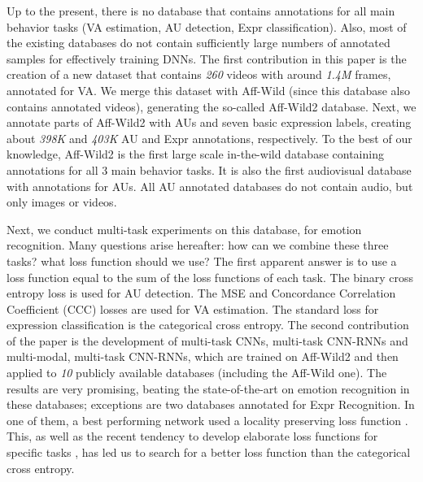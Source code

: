 \documentclass{bmvc2k}
\begin{document}
Up to the present, there is no database that contains annotations for all main behavior tasks (VA estimation, AU detection, Expr classification). Also, most of the existing databases do not contain sufficiently large numbers of annotated samples for effectively training DNNs. The first contribution in this paper is the creation of a new dataset that contains \textit{260} videos with around \textit{1.4M} frames, annotated for VA. We merge this dataset with Aff-Wild (since this database also contains annotated videos), generating the so-called Aff-Wild2 database. Next, we annotate parts of Aff-Wild2 with AUs and seven basic expression labels, creating about \textit{398K} and \textit{403K} AU and Expr annotations, respectively. To the best of our knowledge, Aff-Wild2 is the first  large scale in-the-wild database containing annotations for all 3 main behavior tasks. It is also the first audiovisual database with annotations for AUs. All AU annotated databases do not contain audio, but only images or videos. 


Next, we conduct multi-task experiments on this database, for emotion recognition. Many questions arise hereafter: how can we combine these three tasks? what loss function should we use? The first apparent answer is to use a loss function equal to the sum of the loss functions of each task. The binary cross entropy loss is used for AU detection. The MSE and Concordance Correlation Coefficient (CCC) losses are used for VA estimation. The standard loss for expression classification is the categorical cross entropy. 
The second contribution of the paper is the development of multi-task CNNs, multi-task CNN-RNNs and  multi-modal, multi-task CNN-RNNs, which are trained on Aff-Wild2 and then applied to \textit{10} publicly available databases (including the Aff-Wild one). The results are very promising, beating the state-of-the-art on emotion recognition in these databases; exceptions are two databases annotated for Expr Recognition. In one of them, a best performing network used a locality preserving loss function \cite{li2017reliable}. This, as well as the recent tendency to develop elaborate loss functions for specific tasks \cite{kollias2018training}, has led us to search for a better loss function than the categorical cross entropy. 
\end{document}
